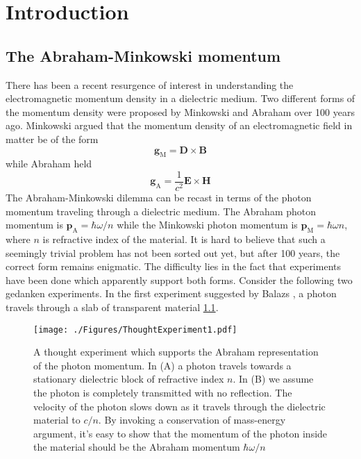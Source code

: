 \chapter{Introduction}

\section{The Abraham-Minkowski momentum}

There has been a recent resurgence of interest in understanding the electromagnetic momentum density in a dielectric medium. Two different forms of the momentum density were proposed by Minkowski and Abraham over 100 years ago.  Minkowski argued that the momentum density of an electromagnetic field in matter be of the form 
\begin{equation}
\mathbf{g}_{\mathrm{M}}=\mathbf{D}\times\mathbf{B}
\end{equation}
while Abraham held 
\begin{equation}
\mathbf{g}_{\mathrm{A}}=\frac{1}{c^2}\mathbf{E}\times\mathbf{H}
\end{equation}
The Abraham-Minkowski dilemma can be recast in terms of the photon momentum traveling through a dielectric medium.  The Abraham photon momentum is $\mathbf{p}_{\mathrm{A}} = \hbar\omega/n$ while the Minkowski photon momentum is $\mathbf{p}_{\mathrm{M}} = \hbar\omega n$, where $n$ is refractive index of the material. It is hard to believe that such a seemingly trivial problem has not been sorted out yet, but after 100 years, the correct form remains enigmatic. The difficulty lies in the fact that experiments have been done which apparently support both forms. Consider the following two gedanken experiments. In the first experiment suggested by Balazs \cite{balazs}, a photon travels through a slab of transparent material \ref{fig:Thought1}.

\begin{figure}[htp]
\texttt{[image: ./Figures/ThoughtExperiment1.pdf]}
\caption{A thought experiment which supports the Abraham representation of the photon momentum.  In (A) a photon travels towards a stationary dielectric block of refractive index $n$.  In (B) we assume the photon is completely transmitted with no reflection.  The velocity of the photon slows down as it travels through the dielectric material to $c/n$.  By invoking a conservation of mass-energy argument, it's easy to show that the momentum of the photon inside the material should be the Abraham momentum $\hbar\omega/n$ } 
\label{fig:Thought1}
\end{figure}

